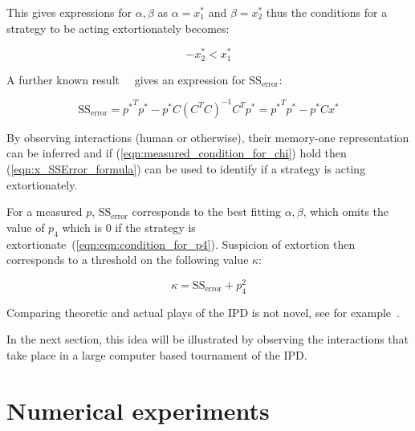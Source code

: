 \documentclass[a4paper]{article}
\begin{document}
This gives expressions for \(\alpha, \beta\) as \(\alpha=x^*_1\) and
\(\beta=x^*_2\) thus the conditions for a strategy to be acting extortionately
becomes:

\begin{equation}
    -x^*_2 < x^*_1 \label{eqn:measured_condition_for_chi}
\end{equation}

A further known result~~\cite{kutner2004applied, rao1973linear,
wakefield2013bayesian} gives an expression for
\(\text{SS}_{\text{error}}\):

\begin{equation}\label{eqn:x_SSError_formula}
    \text{SS}_{\text{error}} = {p ^ *} ^ T p ^ * -
                               p ^ * C \left(C ^ T C \right) ^ {-1} C ^ T p ^ *
                             = {p ^ *} ^ T p ^ * - p ^ * C x ^ *
\end{equation}

By observing interactions (human or otherwise), their memory-one representation
can be inferred and if
(\ref{eqn:measured_condition_for_chi}) hold
then (\ref{eqn:x_SSError_formula}) can be used to identify if a strategy is
acting extortionately.

For a measured \(p\), \(\text{SS}_{\text{error}}\) corresponds to the best
fitting \(\alpha, \beta\), which omits the value of \(p_4\) which is 0 if the
strategy is extortionate~(\ref{eqn:eqn:condition_for_p4}). Suspicion of
extortion then corresponds to a threshold on the following value \(\kappa\):

\begin{equation}\label{eqn:kappa_definition}
    \kappa = \text{SS}_{\text{error}} + p_4 ^ 2
\end{equation}

Comparing theoretic and actual plays of the
IPD is not novel, see for example~\cite{Rand2013}.

In the next section, this idea will be illustrated by observing the interactions
that take place in a large computer based tournament of the IPD\@.

\section{Numerical experiments}\label{sec:numerical-experiments}
\end{document}

